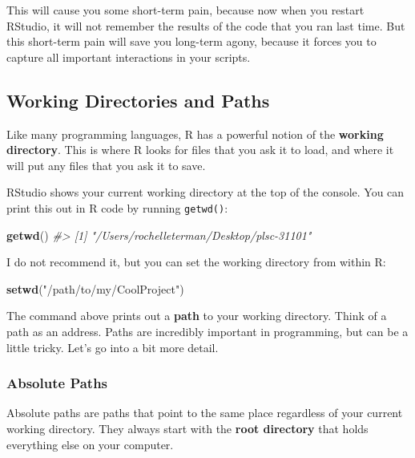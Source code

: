 \documentclass[]{book}
\newenvironment{Shaded}{\begin{snugshade}}{\end{snugshade}}
\newcommand{\KeywordTok}[1]{\textcolor[rgb]{0.13,0.29,0.53}{\textbf{#1}}}
\newcommand{\StringTok}[1]{\textcolor[rgb]{0.31,0.60,0.02}{#1}}
\newcommand{\CommentTok}[1]{\textcolor[rgb]{0.56,0.35,0.01}{\textit{#1}}}
\newcommand{\NormalTok}[1]{#1}
\begin{document}
This will cause you some short-term pain, because now when you restart
RStudio, it will not remember the results of the code that you ran last
time. But this short-term pain will save you long-term agony, because it
forces you to capture all important interactions in your scripts.

\subsection{Working Directories and
Paths}\label{working-directories-and-paths}

Like many programming languages, R has a powerful notion of the
\textbf{working directory}. This is where R looks for files that you ask
it to load, and where it will put any files that you ask it to save.

RStudio shows your current working directory at the top of the console.
You can print this out in R code by running \texttt{getwd()}:

\begin{Shaded}
\begin{Highlighting}[]
\KeywordTok{getwd}\NormalTok{()}
\CommentTok{#> [1] "/Users/rochelleterman/Desktop/plsc-31101"}
\end{Highlighting}
\end{Shaded}

I do not recommend it, but you can set the working directory from within
R:

\begin{Shaded}
\begin{Highlighting}[]
\KeywordTok{setwd}\NormalTok{(}\StringTok{"/path/to/my/CoolProject"}\NormalTok{)}
\end{Highlighting}
\end{Shaded}

The command above prints out a \textbf{path} to your working directory.
Think of a path as an address. Paths are incredibly important in
programming, but can be a little tricky. Let's go into a bit more
detail.

\subsubsection*{Absolute Paths}\label{absolute-paths}

Absolute paths are paths that point to the same place regardless of your
current working directory. They always start with the \textbf{root
directory} that holds everything else on your computer.
\end{document}
